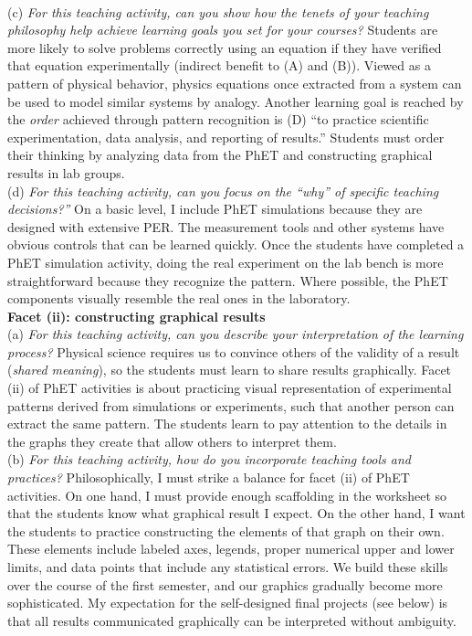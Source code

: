 \documentclass[../../../main.tex]{subfiles}
\begin{document}
\\
\vspace{0.25cm}
(c) \textit{For this teaching activity, can you show how the tenets of your teaching philosophy help achieve learning goals you
set for your courses?}  Students are more likely to solve problems correctly using an equation if they have verified that equation experimentally (indirect benefit to (A) and (B)).  Viewed as a pattern of physical behavior, physics equations once extracted from a system can be used to model similar systems by analogy.  Another learning goal is reached by the \textit{order} achieved through pattern recognition is (D) ``to practice scientific experimentation, data analysis, and reporting of results.''  Students must order their thinking by analyzing data from the PhET and constructing graphical results in lab groups.
\\
\vspace{0.25cm}
(d) \textit{For this teaching activity, can you focus on the ``why'' of specific teaching decisions?''}  On a basic level, I include PhET simulations because they are designed with extensive PER.  The measurement tools and other systems have obvious controls that can be learned quickly.  Once the students have completed a PhET simulation activity, doing the real experiment on the lab bench is more straightforward because they recognize the pattern.  Where possible, the PhET components visually resemble the real ones in the laboratory.
\\
\vspace{0.25cm}
\textbf{Facet (ii): constructing graphical results}
\\
\vspace{0.25cm}
(a) \textit{For this teaching activity, can you describe your interpretation of the learning process?} Physical science requires us to convince others of the validity of a result (\textit{shared meaning}), so the students must learn to share results graphically.  Facet (ii) of PhET activities is about practicing visual representation of experimental patterns derived from simulations or experiments, such that another person can extract the same pattern.  The students learn to pay attention to the details in the graphs they create that allow others to interpret them.
\\
\vspace{0.25cm}
(b) \textit{For this teaching activity, how do you incorporate teaching tools and practices?} Philosophically, I must strike a balance for facet (ii) of PhET activities.  On one hand, I must provide enough scaffolding in the worksheet so that the students know what graphical result I expect.  On the other hand, I want the students to practice constructing the elements of that graph on their own.  These elements include labeled axes, legends, proper numerical upper and lower limits, and data points that include any statistical errors.  We build these skills over the course of the first semester, and our graphics gradually become more sophisticated.  My expectation for the self-designed final projects (see below) is that all results communicated graphically can be interpreted without ambiguity. 
\end{document}
